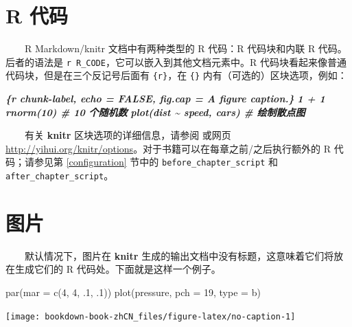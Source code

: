 \documentclass[
  12pt,
]{krantz}
\newenvironment{Shaded}{\begin{snugshade}}{\end{snugshade}}
\newcommand{\AttributeTok}[1]{\textcolor[rgb]{0.77,0.63,0.00}{#1}}
\newcommand{\DecValTok}[1]{\textcolor[rgb]{0.00,0.00,0.81}{#1}}
\newcommand{\FunctionTok}[1]{\textcolor[rgb]{0.00,0.00,0.00}{#1}}
\newcommand{\InformationTok}[1]{\textcolor[rgb]{0.56,0.35,0.01}{\textbf{\textit{#1}}}}
\newcommand{\NormalTok}[1]{#1}
\newcommand{\StringTok}[1]{\textcolor[rgb]{0.31,0.60,0.02}{#1}}
\theoremstyle{definition}
\theoremstyle{definition}
\theoremstyle{definition}
\theoremstyle{definition}
\theoremstyle{remark}
\begin{document}
\hypertarget{r-code}{%
\section{R 代码}\label{r-code}}

  R Markdown/knitr 文档中有两种类型的 R 代码：R 代码块和内联 R 代码。后者的语法是 \texttt{\textasciigrave{}r\ R\_CODE\textasciigrave{}}，它可以嵌入到其他文档元素中。R 代码块看起来像普通代码块，但是在三个反记号后面有 \texttt{\{r\}}，在 \texttt{\{\}} 内有（可选的）区块选项，例如：

\begin{Shaded}
\begin{Highlighting}[]
\InformationTok{\textasciigrave{}\textasciigrave{}\textasciigrave{}\{r chunk{-}label, echo = FALSE, fig.cap = \textquotesingle{}A figure caption.\textquotesingle{}\}}
\InformationTok{1 + 1}
\InformationTok{rnorm(10)  \# 10 个随机数}
\InformationTok{plot(dist \textasciitilde{} speed, cars)  \# 绘制散点图}
\InformationTok{\textasciigrave{}\textasciigrave{}\textasciigrave{}}
\end{Highlighting}
\end{Shaded}

  有关 \textbf{knitr} 区块选项的详细信息，请参阅 \citet{xie2015} 或网页 \url{http://yihui.org/knitr/options}。对于书籍可以在每章之前/之后执行额外的 R 代码；请参见第 \ref{configuration} 节中的 \texttt{before\_chapter\_script} 和 \texttt{after\_chapter\_script}。

\hypertarget{figures}{%
\section{图片}\label{figures}}

  默认情况下，图片在 \textbf{knitr} 生成的输出文档中没有标题，这意味着它们将放在生成它们的 R 代码处。下面就是这样一个例子。

\begin{Shaded}
\begin{Highlighting}[]
\FunctionTok{par}\NormalTok{(}\AttributeTok{mar =} \FunctionTok{c}\NormalTok{(}\DecValTok{4}\NormalTok{, }\DecValTok{4}\NormalTok{, .}\DecValTok{1}\NormalTok{, .}\DecValTok{1}\NormalTok{))}
\FunctionTok{plot}\NormalTok{(pressure, }\AttributeTok{pch =} \DecValTok{19}\NormalTok{, }\AttributeTok{type =} \StringTok{\textquotesingle{}b\textquotesingle{}}\NormalTok{)}
\end{Highlighting}
\end{Shaded}

\texttt{[image: bookdown-book-zhCN\_files/figure-latex/no-caption-1]}
\end{document}
